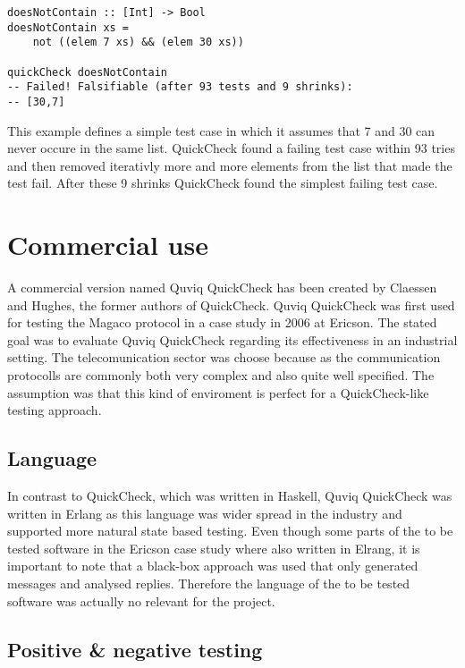 \documentclass[a4paper, 12pt]{article} %
\begin{document}
\begin{verbatim}
doesNotContain :: [Int] -> Bool
doesNotContain xs = 
    not ((elem 7 xs) && (elem 30 xs))

quickCheck doesNotContain
-- Failed! Falsifiable (after 93 tests and 9 shrinks):
-- [30,7]
\end{verbatim}

This example defines a simple test case in which it assumes that 7 and 30 can never occure in the same list. QuickCheck found a failing test case within 93 tries and then removed iterativly more and more elements from the list that made the test fail. After these 9 shrinks QuickCheck found the simplest failing test case.

\section{Commercial use}

A commercial version named Quviq QuickCheck has been created by Claessen and Hughes, the former authors of QuickCheck. Quviq QuickCheck was first used for testing the Magaco protocol in a case study in 2006 at Ericson. The stated goal was to evaluate Quviq QuickCheck regarding its effectiveness in an industrial setting. The telecomunication sector was choose because as the communication protocolls are commonly both very complex and also quite well specified. The assumption was that this kind of enviroment is perfect for a QuickCheck-like testing approach. \cite{Arts06}

\subsection{Language}

In contrast to QuickCheck, which was written in Haskell, Quviq QuickCheck was written in Erlang as this language was wider spread in the industry and supported more natural state based testing. Even though some parts of the to be tested software in the Ericson case study where also written in Elrang, it is important to note that a black-box approach was used that only generated messages and analysed replies. Therefore the language of the to be tested software was actually no relevant for the project. \cite{Arts06} 

\subsection{Positive \& negative testing}
\end{document}
